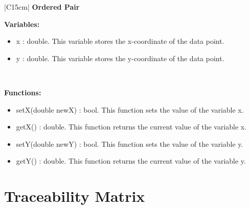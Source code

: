 \documentclass[letterpaper,english, 12pt]{scrreprt}
\begin{document}
\begin{center}
	\begin{tabular}{|C{15cm}|}
		\hline
			\textbf{Ordered Pair} \\
		\hline
			\begin{flushleft}
				\textbf{Variables: }\\
			\end{flushleft}
				\begin{itemize}
					\item x : double. This variable stores the x-coordinate of the data point.
					\item y : double. This variable stores the y-coordinate of the data point.
				\end{itemize} \\
			\hline
			\begin{flushleft}
				\textbf{Functions: } \\
			\end{flushleft}
				\begin{itemize}
					\item setX(double newX) : bool. This function sets the value of the variable x.
					\item getX() : double. This function returns the current value of the variable x.
					\item setY(double newY) : bool. This function sets the value of the variable y.
					\item getY() : double. This function returns the current value of the variable y.
				\end{itemize}
			\hline
	\end{tabular}
\end{center}



\section{Traceability Matrix}
\end{document}
